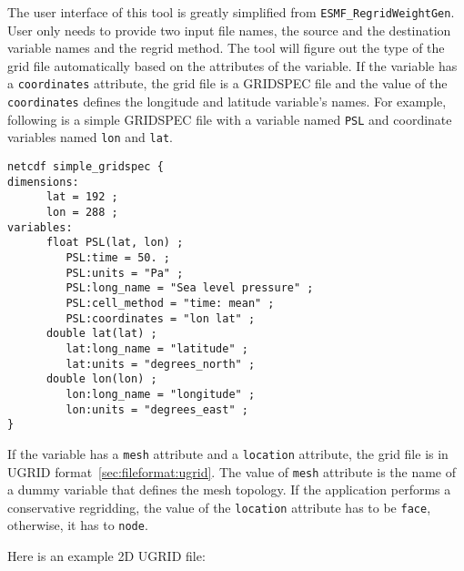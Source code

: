 The user interface of this tool is greatly simplified from {\tt ESMF\_RegridWeightGen}.  User only 
needs to provide two input file names, the source and the destination variable names and the regrid method.  The tool will figure out the type of the grid file automatically based on the attributes of the variable.
If the variable has a {\tt coordinates} attribute, the grid file is a GRIDSPEC file and the value of the 
{\tt coordinates} defines the longitude and latitude variable's names.  For example, following is a simple
GRIDSPEC file with a variable named {\tt PSL} and coordinate variables named {\tt lon} and {\tt lat}.

\label{gridspecexample}
\begin{verbatim}
netcdf simple_gridspec {
dimensions:
      lat = 192 ;
      lon = 288 ;
variables:
      float PSL(lat, lon) ;
         PSL:time = 50. ;
         PSL:units = "Pa" ;
         PSL:long_name = "Sea level pressure" ;
         PSL:cell_method = "time: mean" ;
         PSL:coordinates = "lon lat" ;
      double lat(lat) ;
         lat:long_name = "latitude" ;
         lat:units = "degrees_north" ;
      double lon(lon) ;
         lon:long_name = "longitude" ;
         lon:units = "degrees_east" ;
}
\end{verbatim}

If the variable has a {\tt mesh} attribute and a {\tt location} attribute, the grid file is in UGRID 
format~\ref{sec:fileformat:ugrid}.  The value of {\tt mesh} attribute is the name of a dummy variable that defines the mesh topology.  If the application performs a conservative regridding, the value of the {\tt location} attribute has to be {\tt face}, otherwise, it has to {\tt node}.

Here is an example 2D UGRID file:

